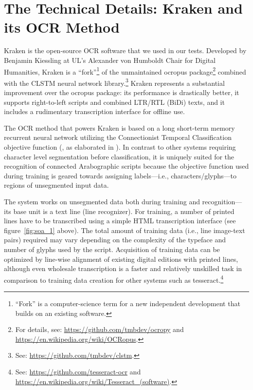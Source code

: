 \section{The Technical Details: Kraken and its OCR Method}

Kraken is the open-source OCR software that we used in our tests. Developed by
Benjamin Kiessling at UL’s Alexander von Humboldt Chair for Digital Humanities,
Kraken is a “fork”\footnote{“Fork” is a computer-science term for a new
independent development that builds on an existing software.} of the
unmaintained ocropus package\footnote{For details, see:
\url{https://github.com/tmbdev/ocropy} and
\url{https://en.wikipedia.org/wiki/OCRopus}.} combined with the CLSTM neural
network library.\footnote{See: \url{https://github.com/tmbdev/clstm}.} Kraken
represents a substantial improvement over the ocropus package: its performance
is drastically better, it supports right-to-left scripts and combined LTR/RTL
(BiDi) texts, and it includes a rudimentary transcription interface for offline
use.

The OCR method that powers Kraken is based on a long short-term memory
\cite{hochreiter1997long} recurrent neural network utilizing the Connectionist
Temporal Classification objective function (\cite{graves2006connectionist}, as
elaborated in \cite{breuel2013high}). In contrast to other systems requiring
character level segmentation before classification, it is uniquely suited for
the recognition of connected Arabographic scripts because the objective
function used during training is geared towards assigning labels—i.e.,
characters/glyphs—to regions of unsegmented input data. 

The system works on unsegmented data both during training and recognition—its
base unit is a text line (line recognizer). For training, a number of printed
lines have to be transcribed using a simple HTML transcription interface (see
figure~\ref{fig:soa_1} above). The total amount of training data (i.e., line image-text
pairs) required may vary depending on the complexity of the typeface and number
of glyphs used by the script. Acquisition of training data can be optimized by
line-wise alignment of existing digital editions with printed lines, although
even wholesale transcription is a faster and relatively unskilled task in
comparison to training data creation for other systems such as
tesseract.\footnote{See: \url{https://github.com/tesseract-ocr} and
\url{https://en.wikipedia.org/wiki/Tesseract_(software)}.}

